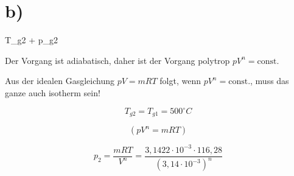 

\section*{b)}

 T_{g2} + p_{g2}

Der Vorgang ist adiabatisch, daher ist der Vorgang polytrop $pV^n = \text{const.}$

Aus der idealen Gasgleichung $pV = mRT$ folgt, wenn $pV^n = \text{const.}$, muss das ganze auch isotherm sein!

\[
T_{g2} = T_{g1} = 500^\circ C
\]

\[
\left( pV^n = mRT \right)
\]

\[
p_2 = \frac{mRT}{V^n} = \frac{3,1422 \cdot 10^{-3} \cdot 116,28}{(3,14 \cdot 10^{-3})^n}
\]